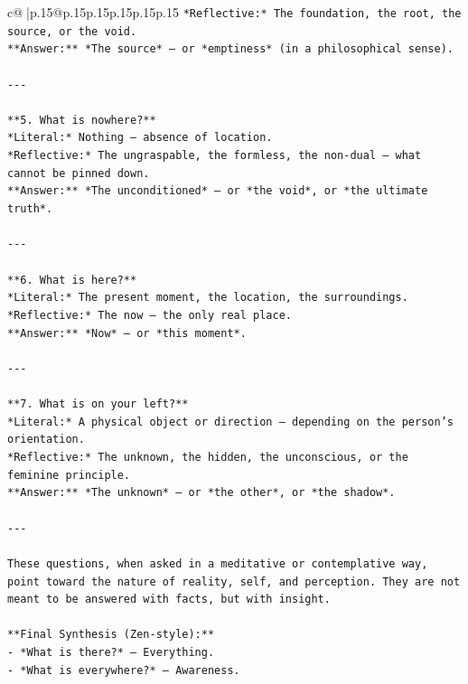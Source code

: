 \documentclass{article}
\begin{document}
{\begin{supertabular}{c@{$\;$}|p{.15\linewidth}@{}p{.15\linewidth}p{.15\linewidth}p{.15\linewidth}p{.15\linewidth}p{.15\linewidth}}
{{{\texttt{*Reflective:* The foundation, the root, the source, or the void.  } \\
\texttt{**Answer:** *The source* — or *emptiness* (in a philosophical sense).} \\
\\ 
\texttt{{-}{-}{-}} \\
\\ 
\texttt{**5. What is nowhere?**  } \\
\texttt{*Literal:* Nothing — absence of location.  } \\
\texttt{*Reflective:* The ungraspable, the formless, the non{-}dual — what cannot be pinned down.  } \\
\texttt{**Answer:** *The unconditioned* — or *the void*, or *the ultimate truth*.} \\
\\ 
\texttt{{-}{-}{-}} \\
\\ 
\texttt{**6. What is here?**  } \\
\texttt{*Literal:* The present moment, the location, the surroundings.  } \\
\texttt{*Reflective:* The now — the only real place.  } \\
\texttt{**Answer:** *Now* — or *this moment*.} \\
\\ 
\texttt{{-}{-}{-}} \\
\\ 
\texttt{**7. What is on your left?**  } \\
\texttt{*Literal:* A physical object or direction — depending on the person’s orientation.  } \\
\texttt{*Reflective:* The unknown, the hidden, the unconscious, or the feminine principle.  } \\
\texttt{**Answer:** *The unknown* — or *the other*, or *the shadow*.} \\
\\ 
\texttt{{-}{-}{-}} \\
\\ 
\texttt{These questions, when asked in a meditative or contemplative way, point toward the nature of reality, self, and perception. They are not meant to be answered with facts, but with insight.} \\
\\ 
\texttt{**Final Synthesis (Zen{-}style):**  } \\
\texttt{{-} *What is there?* — Everything.  } \\
\texttt{{-} *What is everywhere?* — Awareness.  } \\
}}}
\end{supertabular}}
\end{document}
